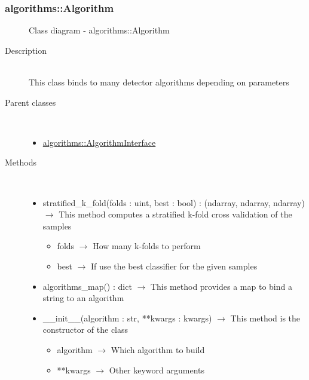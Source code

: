 \subsubsection[Algorithm]{algorithms::Algorithm}
\begin{figure}[h]
\centering
{}
\caption{Class diagram - algorithms::Algorithm}
\end{figure}\begin{description}
\item[Description] \hfill \\
 This class binds to many detector algorithms depending on parameters
\item[Parent classes] \hfill \\
 \vspace{-1cm}
\begin{itemize}
\item \hyperlink{algorithms::AlgorithmInterface}{algorithms::AlgorithmInterface}
\end{itemize}

\item[Methods] \hfill \\
 \vspace{-1cm}
\begin{itemize}
\item stratified\_k\_fold(folds : uint, best : bool) : (ndarray, ndarray, ndarray) $\rightarrow$ This method computes a stratified k-fold cross validation of the samples\begin{itemize}
\item folds $\rightarrow$ How many k-folds to perform
\item best $\rightarrow$ If use the best classifier for the given samples
\end{itemize}

\item algorithms\_map() : dict $\rightarrow$ This method provides a map to bind a string to an algorithm
\item \_\_init\_\_(algorithm : str, **kwargs : kwargs) $\rightarrow$ This method is the constructor of the class\begin{itemize}
\item algorithm $\rightarrow$ Which algorithm to build
\item **kwargs $\rightarrow$ Other keyword arguments
\end{itemize}

\end{itemize}

\end{description}
\hypertarget{algorithms::AbstractAlgorithm}{}
